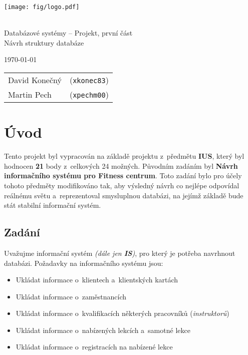 \documentclass[a4paper]{article}
\newcommand{\logo} {
  \texttt{[image: fig/logo.pdf]}
}
\begin{document}
  \begin{titlepage}
    \begin{center}
      \logo
      \\
      {\Huge Databázové systémy -- Projekt, první část}\\\medskip
      {\LARGE Návrh struktury databáze}\\\medskip
    \end{center}
  
    {\Large \today \hfill
      \begin{tabular}{l l}
	 	    David Konečný & (\texttt{xkonec83}) \\
	  	  Martin Pech   & (\texttt{xpechm00}) \\
	  \end{tabular}}
  \end{titlepage}

  \section{Úvod}
  \label{sec:intro}

    Tento projekt byl vypracován na základě projektu z~předmětu \textbf{IUS}, který byl hodnocen \textbf{21} body z~celkových 24 možných. Původním zadáním byl \textbf{Návrh informačního systému pro Fitness centrum}. Toto zadání bylo pro účely tohoto předměty modifikováno tak, aby výsledný návrh co nejlépe odpovídal reálnému světu a~reprezentoval smysluplnou databázi, na jejímž základě bude stát stabilní informační systém.
    
    \subsection{Zadání}
    \label{subsec:assignment}

      Uvažujme informační systém \emph{(dále jen \textbf{IS})}, pro který je potřeba navrhnout databázi. Požadavky na informačního systému jsou:
      
      \begin{itemize}
        \item Ukládat informace o~klientech a~klientských kartách
        \item Ukládat informace o~zaměstnancích
        \item Ukládat informace o~kvalifikacích některých pracovníků (\textit{instruktorů})
        \item Ukládat informace o~nabízených lekcích a~samotné lekce
        \item Ukládat informace o~registracích na nabízené lekce
      \end{itemize}
\end{document}
